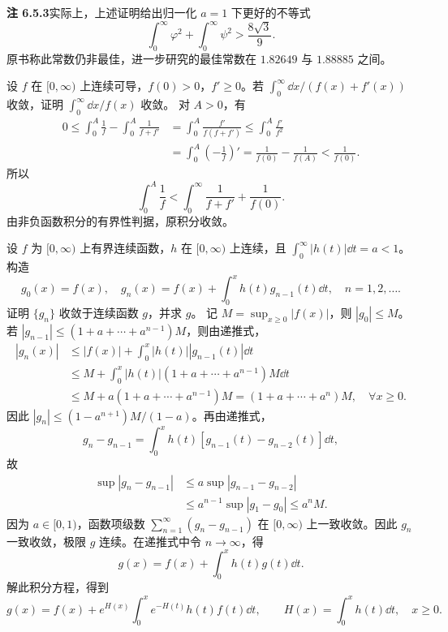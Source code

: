 \textbf{注 6.5.3}\quad 实际上，上述证明给出归一化 $a=1$ 下更好的不等式
\begin{equation}
\int_0^\infty\varphi^2+\int_0^\infty\psi^2>\frac{8\sqrt3}{9}.\tag{6.5.7}
\end{equation}
原书称此常数仍非最佳，进一步研究的最佳常数在 $1.82649$ 与 $1.88885$ 之间。

设 $f$ 在 $[0,\infty)$ 上连续可导，$f(0)>0$，$f'\ge0$。若 $\int_0^\infty\dd x/(f(x)+f'(x))$ 收敛，证明 $\int_0^\infty\dd x/f(x)$ 收敛。
\prooftext 对 $A>0$，有
\begin{align*}
0\le\int_0^A\frac1f-\int_0^A\frac1{f+f'}
&=\int_0^A\frac{f'}{f(f+f')}\le\int_0^A\frac{f'}{f^2}\\
&=\int_0^A\left(-\frac1f\right)'=\frac1{f(0)}-\frac1{f(A)}<\frac1{f(0)}.
\end{align*}
所以
\[
\int_0^A\frac1f<\int_0^\infty\frac1{f+f'}+\frac1{f(0)}.
\]
由非负函数积分的有界性判据，原积分收敛。

设 $f$ 为 $[0,\infty)$ 上有界连续函数，$h$ 在 $[0,\infty)$ 上连续，且 $\int_0^\infty|h(t)|\dd t=a<1$。构造
\[
g_0(x)=f(x),\quad g_n(x)=f(x)+\int_0^xh(t)g_{n-1}(t)\dd t,\quad n=1,2,\ldots.
\]
证明 $\{g_n\}$ 收敛于连续函数 $g$，并求 $g$。
\prooftext 记 $M=\sup_{x\ge0}|f(x)|$，则 $|g_0|\le M$。若
$|g_{n-1}|\le(1+a+\cdots+a^{n-1})M$，则由递推式，
\begin{align*}
|g_n(x)|&\le|f(x)|+\int_0^x|h(t)||g_{n-1}(t)|\dd t\\
&\le M+\int_0^x|h(t)|(1+a+\cdots+a^{n-1})M\dd t\\
&\le M+a(1+a+\cdots+a^{n-1})M=(1+a+\cdots+a^n)M,\quad\forall x\ge0.
\end{align*}
因此 $|g_n|\le(1-a^{n+1})M/(1-a)$。再由递推式，
\[
g_n-g_{n-1}=\int_0^xh(t)[g_{n-1}(t)-g_{n-2}(t)]\dd t,
\]
故
\begin{align*}
\sup|g_n-g_{n-1}|&\le a\sup|g_{n-1}-g_{n-2}|\\
&\le a^{n-1}\sup|g_1-g_0|\le a^nM.
\end{align*}
因为 $a\in[0,1)$，函数项级数 $\sum_{n=1}^\infty(g_n-g_{n-1})$ 在 $[0,\infty)$ 上一致收敛。因此 $g_n$ 一致收敛，极限 $g$ 连续。在递推式中令 $n\to\infty$，得
\[
g(x)=f(x)+\int_0^xh(t)g(t)\dd t.
\]
解此积分方程，得到
\[
g(x)=f(x)+e^{H(x)}\int_0^xe^{-H(t)}h(t)f(t)\dd t,
\qquad H(x)=\int_0^xh(t)\dd t,\quad x\ge0.
\]
